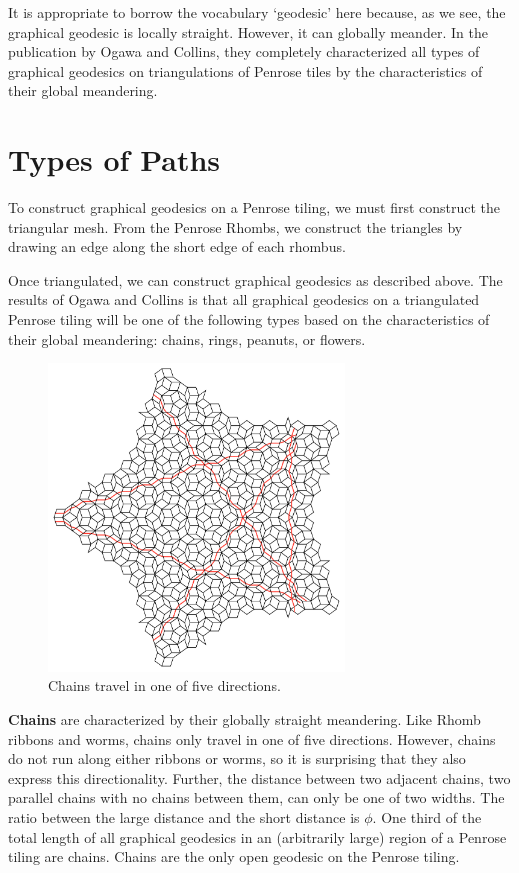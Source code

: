 \documentclass[
  oneside,
  11pt, a4paper,
  footinclude=true,
  headinclude=true,
  cleardoublepage=empty
]{scrbook}
\begin{document}
It is appropriate to borrow the vocabulary `geodesic' here because, as we see, the graphical geodesic is locally straight. However, it can globally meander. In the publication by Ogawa and Collins, they completely characterized all types of graphical geodesics on triangulations of Penrose tiles by the characteristics of their global meandering.

\section{Types of Paths}
To construct graphical geodesics on a Penrose tiling, we must first construct the triangular mesh. From the Penrose Rhombs, we construct the triangles by drawing an edge along the short edge of each rhombus. 

Once triangulated, we can construct graphical geodesics as described above. The results of Ogawa and Collins is that all graphical geodesics on a triangulated Penrose tiling will be one of the following types based on the characteristics of their global meandering: chains, rings, peanuts, or flowers.

\begin{figure}[H]
\centering
\includegraphics[width=0.7\textwidth]{Chains}
\caption[Chains]{Chains travel in one of five directions.}
\end{figure}
\textbf{Chains} are characterized by their globally straight meandering. Like Rhomb ribbons and worms, chains only travel in one of five directions. However, chains do not run along either ribbons or worms, so it is surprising that they also express this directionality. Further, the distance between two adjacent chains, two parallel chains with no chains between them, can only be one of two widths. The ratio between the large distance and the short distance is $\phi$. One third of the total length of all graphical geodesics in an (arbitrarily large) region of a Penrose tiling are chains. Chains are the only open geodesic on the Penrose tiling.
\end{document}
